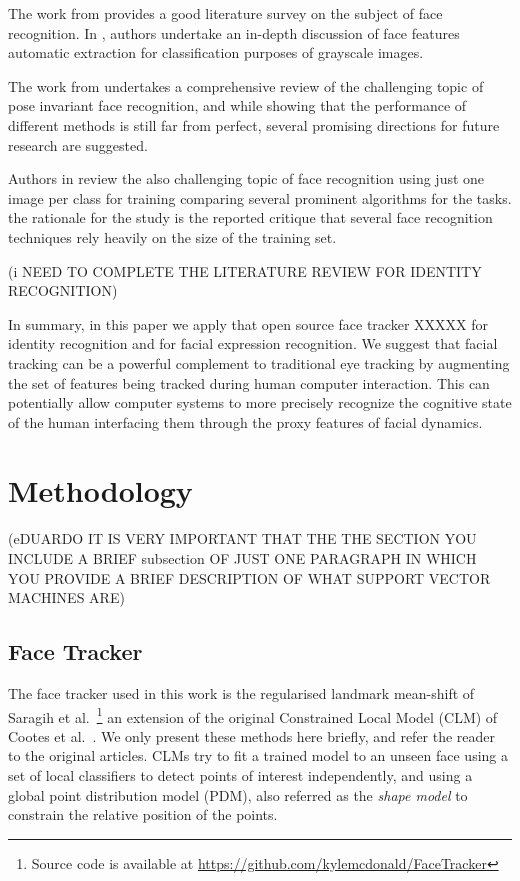\documentclass[]{article}
\begin{document}
The work from \cite{Zhao:2003} provides a good literature survey on the subject of face recognition. In
\cite{Craw1987183}, authors undertake an in-depth discussion of face features automatic extraction for classification purposes of
grayscale images.

The work from \cite{Zhang20092876} undertakes a comprehensive review  of the challenging topic of pose invariant face
recognition, and while showing that the performance of different methods is still far from perfect, several promising
directions for future research  are suggested.

Authors in \cite{Tan20061725} review the also challenging topic of face recognition using  just one image per
class for training comparing several prominent algorithms for the tasks. the rationale for the study is the reported
critique that several face recognition techniques rely heavily on the size of the training set.

(i NEED TO COMPLETE THE LITERATURE REVIEW FOR IDENTITY RECOGNITION)

In summary, in this paper we apply that open source face tracker XXXXX for identity recognition and for facial
expression recognition. We suggest that facial tracking can be a powerful complement to traditional eye tracking  by
augmenting the set of features being tracked during human computer interaction. This  can potentially allow computer
systems to more precisely recognize the cognitive state of the human interfacing them through the proxy features of facial
dynamics.


\section{Methodology}
(eDUARDO IT IS VERY IMPORTANT THAT THE THE SECTION YOU INCLUDE A BRIEF subsection OF JUST ONE PARAGRAPH IN WHICH YOU
PROVIDE A BRIEF DESCRIPTION OF WHAT SUPPORT VECTOR MACHINES ARE)

\subsection{Face Tracker}

The face tracker used in this work is the regularised landmark
mean-shift of Saragih et
al.~\cite{saragih2011deformable}\footnote{Source code is available at
  \url{https://github.com/kylemcdonald/FaceTracker}} an extension of
the original Constrained Local Model (CLM) of Cootes et
al.~\cite{cristinacce2006feature}. We only present these methods here
briefly, and refer the reader to the original articles. CLMs try to
fit a trained model to an unseen face using a set of local classifiers
to detect points of interest independently, and using a global point
distribution model (PDM), also referred as the \textit{shape model} to
constrain the relative position of the points.
\end{document}
